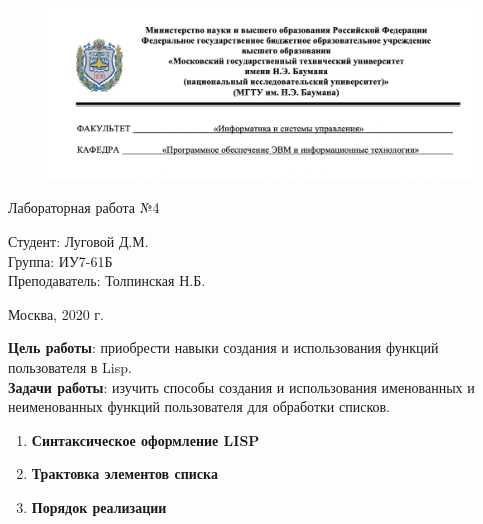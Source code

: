 


	
\begin{figure}[h!]
	\begin{center}
		{\includegraphics[width = \textwidth]{titul.png}}
	\end{center}
\end{figure}

\vspace*{20mm}

\huge
\begin{center}
	Лабораторная работа №4
\end{center}


\vspace*{50mm}

\large
\begin{flushleft}
	Студент: Луговой Д.М. \\
	Группа: ИУ7-61Б \\
	Преподаватель: Толпинская Н.Б.
\end{flushleft}

\vspace*{60mm}

\large
\begin{center}
	Москва, 2020 г.
\end{center}

\thispagestyle{empty}

\newpage
\vspace*{10mm}
\textbf{Цель работы}: приобрести навыки создания и использования функций пользователя в Lisp.\\

\textbf{Задачи работы}: изучить способы создания и использования именованных и неименованных функций пользователя для обработки списков.

\begin{enumerate}
\item \textbf{Синтаксическое оформление LISP}
\item \textbf{Трактовка элементов списка}
\item \textbf{Порядок реализации}
\end{enumerate}

